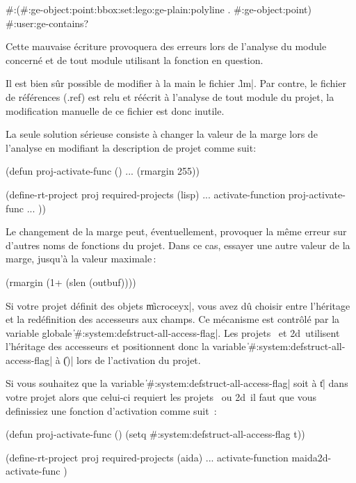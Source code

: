 \begin{Longcode*}
#:(#:ge-object:point:bbox:set:lego:ge-plain:polyline . #:ge-object:point)
#:user:ge-contains?
\end{Longcode*}


Cette mauvaise \'{e}criture provoquera des erreurs lors de l'analyse du
module concern\'{e} et de tout module utilisant la fonction en question.

Il est bien s\^{u}r possible de modifier \`{a} la main le fichier \|.lm|. 
Par contre, le fichier de r\'{e}f\'{e}rences (.ref) est relu et r\'{e}\'{e}crit \`{a}
l'analyse de tout module du projet, la modification manuelle de ce
fichier est donc inutile.

La seule solution s\'{e}rieuse
consiste \`{a} changer la valeur de la marge lors de
l'analyse en modifiant la description de projet comme suit:

\begin{Code*}
(defun proj-activate-func ()
  ...
  (rmargin 255))

(define-rt-project proj
    required-projects (lisp)    
    ...
    activate-function proj-activate-func
    ...
    ))
\end{Code*}

Le changement de la marge peut, \'{e}ventuellement, provoquer la m\^{e}me
erreur sur d'autres noms de fonctions du projet. Dans ce cas, essayer
une autre valeur de la marge, jusqu'\`{a} la valeur maximale\,:

\begin{Code*}
(rmargin (1+ (slen (outbuf))))
\end{Code*}



Si votre projet d\'{e}finit des objets \|microceyx|, vous avez d\^{u}
choisir entre l'h\'{e}ritage et la red\'{e}finition des accesseurs aux
champs. Ce m\'{e}canisme est contr\^{o}l\'{e} par la variable globale
\|#:system:defstruct-all-access-flag|. Les projets \Aida\ et \Masai2d\
utilisent l'h\'{e}ritage des accesseurs et positionnent donc la variable
\|#:system:defstruct-all-access-flag| \`{a} \|()| lors de l'activation du
projet.

Si vous souhaitez que la variable
\|#:system:defstruct-all-access-flag| soit \`{a} \|t| dans votre projet
alors que celui-ci requiert les projets \Aida\ ou \Masai2d\, il faut que
vous definissiez une fonction d'activation comme suit \,:

\begin{Code*}
(defun proj-activate-func ()
  (setq #:system:defstruct-all-access-flag t))               

(define-rt-project proj
  required-projects (aida)      
  ...
  activate-function maida2d-activate-func
  )
\end{Code*}

